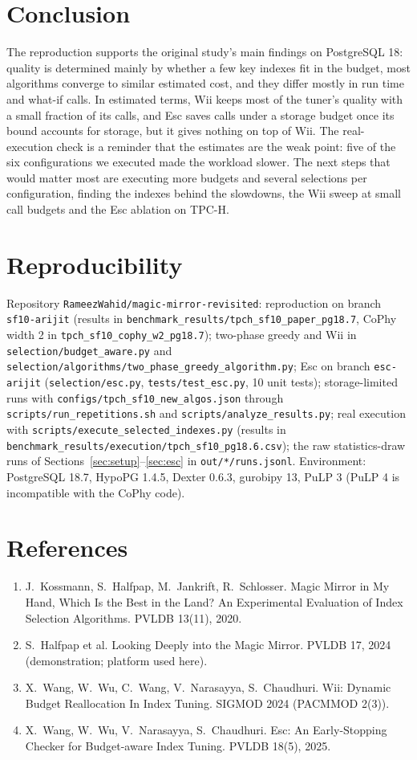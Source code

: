 \section{Conclusion}
The reproduction supports the original study's main findings on PostgreSQL 18: quality is determined mainly by whether a few key indexes fit in the budget, most algorithms converge to similar estimated cost, and they differ mostly in run time and what-if calls. In estimated terms, Wii keeps most of the tuner's quality with a small fraction of its calls, and Esc saves calls under a storage budget once its bound accounts for storage, but it gives nothing on top of Wii. The real-execution check is a reminder that the estimates are the weak point: five of the six configurations we executed made the workload slower. The next steps that would matter most are executing more budgets and several selections per configuration, finding the indexes behind the slowdowns, the Wii sweep at small call budgets and the Esc ablation on TPC-H.

\section*{Reproducibility}\begingroup\raggedright
Repository \texttt{RameezWahid/magic-mirror-revisited}: reproduction on branch \texttt{sf10-arijit} (results in \texttt{benchmark\_results/tpch\_sf10\_paper\_pg18.7}, CoPhy width 2 in \texttt{tpch\_sf10\_cophy\_w2\_pg18.7}); two-phase greedy and Wii in \texttt{selection/budget\_aware.py} and \texttt{selection/algorithms/two\_phase\_greedy\_algorithm.py}; Esc on branch \texttt{esc-arijit} (\texttt{selection/esc.py}, \texttt{tests/test\_esc.py}, 10 unit tests); storage-limited runs with \texttt{configs/tpch\_sf10\_new\_algos.json} through \texttt{scripts/run\_repetitions.sh} and \texttt{scripts/analyze\_results.py}; real execution with \texttt{scripts/execute\_selected\_indexes.py} (results in \texttt{benchmark\_results/execution/tpch\_sf10\_pg18.6.csv}); the raw statistics-draw runs of Sections~\ref{sec:setup}--\ref{sec:esc} in \texttt{out/*/runs.jsonl}. Environment: PostgreSQL 18.7, HypoPG 1.4.5, Dexter 0.6.3, gurobipy 13, PuLP 3 (PuLP 4 is incompatible with the CoPhy code).

\endgroup
\section*{References}
\begin{enumerate}\small
\item J.\ Kossmann, S.\ Halfpap, M.\ Jankrift, R.\ Schlosser. Magic Mirror in My Hand, Which Is the Best in the Land? An Experimental Evaluation of Index Selection Algorithms. PVLDB 13(11), 2020.
\item S.\ Halfpap et al. Looking Deeply into the Magic Mirror. PVLDB 17, 2024 (demonstration; platform used here).
\item X.\ Wang, W.\ Wu, C.\ Wang, V.\ Narasayya, S.\ Chaudhuri. Wii: Dynamic Budget Reallocation In Index Tuning. SIGMOD 2024 (PACMMOD 2(3)).
\item X.\ Wang, W.\ Wu, V.\ Narasayya, S.\ Chaudhuri. Esc: An Early-Stopping Checker for Budget-aware Index Tuning. PVLDB 18(5), 2025.
\end{enumerate}

